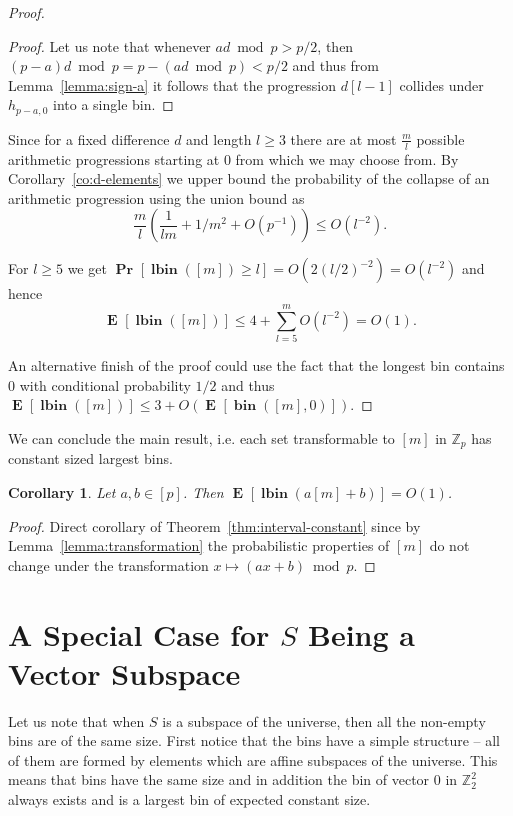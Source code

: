 \documentclass{article}
\newcommand{\vbin}[2]{\operatorname{\mathbf{bin}}({#1}, {#2})}
\newcommand{\vlbin}[1]{\operatorname{\mathbf{lbin}}({#1})}
\newcommand{\vecspace}[2]{\mathbb{Z}_{#1}^{#2}}
\newcommand{\binvecspace}[1]{\vecspace{2}{#1}}
\newcommand{\probs}[2]{\operatorname{\mathbf{Pr}}_{{#1}}\left[{#2}\right]}
\newcommand{\prob}[1]{\probs{}{#1}}
\newcommand{\expects}[2]{\operatorname{\mathbf{E}}_{{#1}}\left[{#2}\right]}
\newcommand{\expect}[1]{\expects{}{#1}}
\newtheorem{corollary}{Corollary}
\begin{document}
\begin{proof}
\begin{proof}
Let us note that whenever $ad \bmod p > p/2$, then $(p - a)d \bmod p = p - (ad \bmod p) < p/2$ and thus from Lemma~\ref{lemma:sign-a} it follows that the progression $d[l-1]$ collides under $h_{p - a, 0}$ into a single bin.
\end{proof}

Since for a fixed difference $d$ and length $l \geq 3$ there are at most $\frac{m}{l}$ possible arithmetic progressions starting at $0$ from which we may choose from. By Corollary~\ref{co:d-elements} we upper bound the probability of the collapse of an arithmetic progression using the union bound as 
\[
\frac{m}{l} \left(\frac{1}{lm} + 1/m^2 + O(p^{-1})\right) \leq O(l^{-2}).
\]

For $l \geq 5$ we get $\prob{\vlbin{[m]} \geq l} = O(2(l / 2)^{-2}) = O(l^{-2})$ and hence
\[
\expect{\vlbin{[m]}} \leq 4 + \sum_{l = 5}^m O\left(l^{-2}\right) = O(1).
\]

An alternative finish of the proof could use the fact that the longest bin contains $0$ with conditional probability $1/2$ and thus $\expect{\vlbin{[m]}} \leq 3 + O(\expect{\vbin{[m]}{0}})$.
\end{proof}

We can conclude the main result, i.e. each set transformable to $[m]$ in $\mathbb{Z}_p$ has constant sized largest bins.
\begin{corollary}
Let $a, b \in [p]$. 
Then $\expect{\vlbin{a[m] + b}} = O(1)$.
\end{corollary}
\begin{proof}
Direct corollary of Theorem~\ref{thm:interval-constant} since by Lemma~\ref{lemma:transformation} the probabilistic properties of $[m]$ do not change under the transformation $x \mapsto (ax + b) \bmod p$.
\end{proof}


\section{A Special Case for $S$ Being a Vector Subspace}

Let us note that when $S$ is a subspace of the universe, then all the non-empty bins are of the same size.
First notice that the bins have a simple structure -- all of them are formed by elements which are affine subspaces of the universe.
This means that bins have the same size and in addition the bin of vector $0$ in $\binvecspace{2}$ always exists and is a largest bin of expected constant size.
\end{document}
